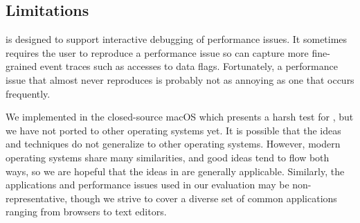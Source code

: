 \subsection{Limitations}
\xxx is designed to support interactive debugging of performance
issues. It sometimes requires the user to reproduce a performance issue so
\xxx can capture more fine-grained event traces such as accesses to data
flags.  Fortunately, a performance issue that almost never reproduces is
probably not as annoying as one that occurs frequently.

We implemented \xxx in the closed-source macOS which presents a harsh test
for \xxx, but we have not ported \xxx to other operating systems yet. It is
possible that the ideas and techniques do not generalize to other operating
systems. However, modern operating systems share many similarities, and good
ideas tend to flow both ways, so we are hopeful that the ideas in \xxx are
generally applicable. Similarly, the applications and performance issues used in
our evaluation may be non-representative, though we strive to cover a
diverse set of common applications ranging from browsers to text editors.
